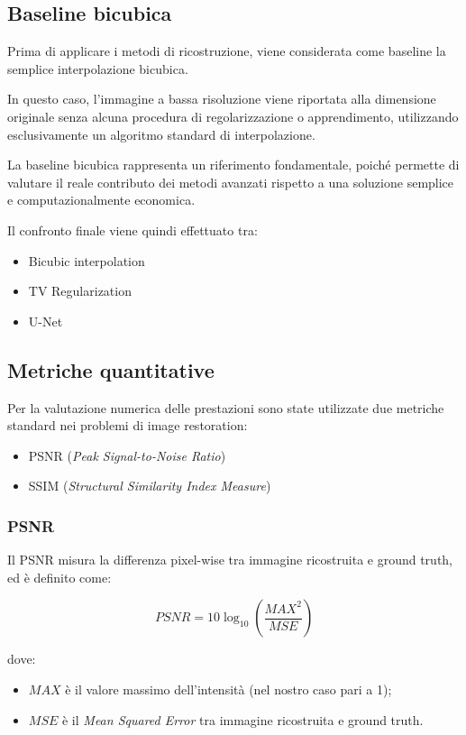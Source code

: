 \documentclass{article}
\begin{document}
\subsection{Baseline bicubica}

Prima di applicare i metodi di ricostruzione, viene considerata come baseline la semplice interpolazione bicubica.

In questo caso, l’immagine a bassa risoluzione viene riportata alla dimensione originale senza alcuna procedura di regolarizzazione o apprendimento, utilizzando esclusivamente un algoritmo standard di interpolazione.

La baseline bicubica rappresenta un riferimento fondamentale, poiché permette di valutare il reale contributo dei metodi avanzati rispetto a una soluzione semplice e computazionalmente economica.

Il confronto finale viene quindi effettuato tra:

\begin{itemize}
    \item Bicubic interpolation
    \item TV Regularization
    \item U-Net
\end{itemize}

\subsection{Metriche quantitative}

Per la valutazione numerica delle prestazioni sono state utilizzate due metriche standard nei problemi di image restoration:

\begin{itemize}
    \item PSNR (\textit{Peak Signal-to-Noise Ratio})
    \item SSIM (\textit{Structural Similarity Index Measure})
\end{itemize}

\subsubsection{PSNR}

Il PSNR misura la differenza pixel-wise tra immagine ricostruita e ground truth, ed è definito come:

\[
PSNR
=
10 \log_{10}
\left(
\frac{MAX^2}{MSE}
\right)
\]

dove:

\begin{itemize}
    \item \(MAX\) è il valore massimo dell’intensità (nel nostro caso pari a 1);
    \item \(MSE\) è il \textit{Mean Squared Error} tra immagine ricostruita e ground truth.
\end{itemize}
\end{document}

